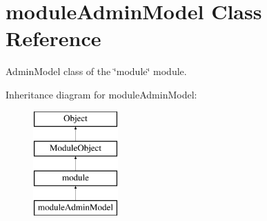 \hypertarget{classmoduleAdminModel}{\section{module\-Admin\-Model Class Reference}
\label{classmoduleAdminModel}
}


Admin\-Model class of the \char`\"{}module\char`\"{} module.  


Inheritance diagram for module\-Admin\-Model\-:\begin{figure}[H]
\begin{center}
\leavevmode
\includegraphics[height=4.000000cm]{classmoduleAdminModel}
\end{center}
\end{figure}
